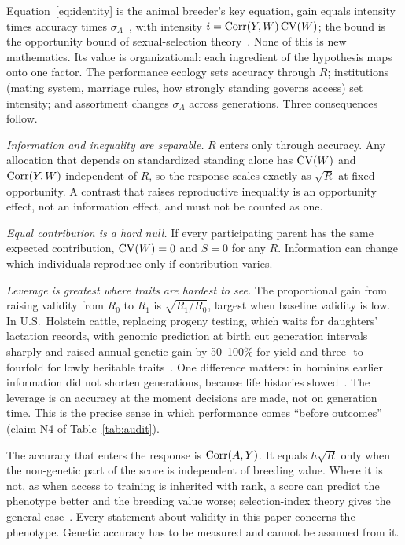Equation~\eqref{eq:identity} is the animal breeder's key equation, gain equals intensity times accuracy times
$\sigma_A$~\cite{lush1937,hazel1943,falconer1996}, with intensity $i=\operatorname{Corr}(Y,W)\operatorname{CV}(W)$; the bound is the opportunity bound of
sexual-selection theory~\cite{crow1958,moorad2013,henshaw2016}. None of this is new mathematics. Its value is organizational:
each ingredient of the hypothesis maps onto one factor. The performance ecology sets accuracy through $R$; institutions
(mating system, marriage rules, how strongly standing governs access) set intensity; and assortment changes $\sigma_A$ across
generations. Three consequences follow.

\emph{Information and inequality are separable.} $R$ enters only through accuracy. Any allocation that depends on
standardized standing alone has $\operatorname{CV}(W)$ and $\operatorname{Corr}(Y,W)$ independent of $R$, so the response scales exactly as $\sqrt{R}$ at
fixed opportunity. A contrast that raises reproductive inequality is an opportunity effect, not an information effect, and
must not be counted as one.

\emph{Equal contribution is a hard null.} If every participating parent has the same expected contribution, $\operatorname{CV}(W)=0$ and
$S=0$ for any $R$. Information can change which individuals reproduce only if contribution varies.

\emph{Leverage is greatest where traits are hardest to see.} The proportional gain from raising validity from $R_0$ to $R_1$
is $\sqrt{R_1/R_0}$, largest when baseline validity is low. In U.S.\ Holstein cattle, replacing progeny testing, which
waits for daughters' lactation records, with genomic prediction at birth cut generation intervals sharply and raised annual
genetic gain by 50--100\% for yield and three- to fourfold for lowly heritable traits~\cite{garciaruiz2016}. One difference
matters: in hominins earlier information did not shorten generations, because life histories
slowed~\cite{kaplan2000,zollikofer2024}. The leverage is on accuracy at the moment decisions are made, not on generation
time. This is the precise sense in which performance comes ``before outcomes'' (claim N4 of Table~\ref{tab:audit}).

\begin{remark}
The accuracy that enters the response is $\operatorname{Corr}(A,Y)$. It equals $h\sqrt R$ only when the non-genetic part of the score is
independent of breeding value. Where it is not, as when access to training is inherited with rank, a score can predict the
phenotype better and the breeding value worse; selection-index theory gives the general case~\cite{hazel1943}. Every statement
about validity in this paper concerns the phenotype. Genetic accuracy has to be measured and cannot be assumed from it.
\end{remark}

